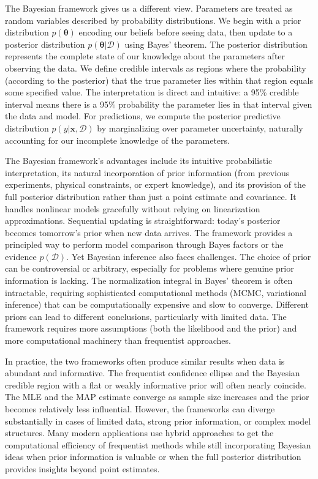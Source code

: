 The Bayesian framework gives us a different view. Parameters are treated as random variables described by probability distributions. We begin with a prior distribution $p(\boldsymbol{\theta})$ encoding our beliefs before seeing data, then update to a posterior distribution $p(\boldsymbol{\theta}|\mathcal{D})$ using Bayes' theorem. The posterior distribution represents the complete state of our knowledge about the parameters after observing the data. We define credible intervals as regions where the probability (according to the posterior) that the true parameter lies within that region equals some specified value. The interpretation is direct and intuitive: a 95\% credible interval means there is a 95\% probability the parameter lies in that interval given the data and model. For predictions, we compute the posterior predictive distribution $p(y|\mathbf{x}, \mathcal{D})$ by marginalizing over parameter uncertainty, naturally accounting for our incomplete knowledge of the parameters.

The Bayesian framework's advantages include its intuitive probabilistic interpretation, its natural incorporation of prior information (from previous experiments, physical constraints, or expert knowledge), and its provision of the full posterior distribution rather than just a point estimate and covariance. It handles nonlinear models gracefully without relying on linearization approximations. Sequential updating is straightforward: today's posterior becomes tomorrow's prior when new data arrives. The framework provides a principled way to perform model comparison through Bayes factors or the evidence $p(\mathcal{D})$. Yet Bayesian inference also faces challenges. The choice of prior can be controversial or arbitrary, especially for problems where genuine prior information is lacking. The normalization integral in Bayes' theorem is often intractable, requiring sophisticated computational methods (MCMC, variational inference) that can be computationally expensive and slow to converge. Different priors can lead to different conclusions, particularly with limited data. The framework requires more assumptions (both the likelihood and the prior) and more computational machinery than frequentist approaches.

In practice, the two frameworks often produce similar results when data is abundant and informative. The frequentist confidence ellipse and the Bayesian credible region with a flat or weakly informative prior will often nearly coincide. The MLE and the MAP estimate converge as sample size increases and the prior becomes relatively less influential. However, the frameworks can diverge substantially in cases of limited data, strong prior information, or complex model structures. Many modern applications use hybrid approaches to get the computational efficiency of frequentist methods while still incorporating Bayesian ideas when prior information is valuable or when the full posterior distribution provides insights beyond point estimates.

